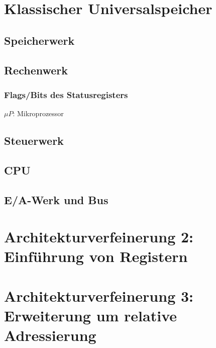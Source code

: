 \section{Klassischer Universalspeicher}
\subsection{Speicherwerk}
\subsection{Rechenwerk}
\subsubsection{Flags/Bits des Statusregisters}
$\mu P$: Mikroprozessor
\subsection{Steuerwerk}
\subsection{CPU}
\subsection{E/A-Werk und Bus}

\section{Architekturverfeinerung 2: Einführung von Registern}

\section{Architekturverfeinerung 3: Erweiterung um relative Adressierung}

